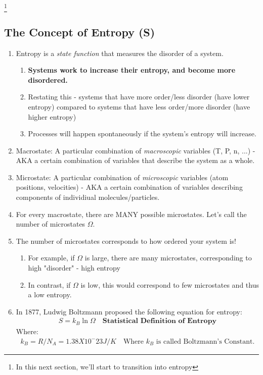 \documentclass{article}  %
\begin{document}
\footnote{In this next section, we'll start to transition into entropy}
\subsection*{The Concept of Entropy (S)}
\begin{enumerate}
    \item Entropy is a \emph{state function} that measures the disorder of a system.
    \begin{enumerate}
        \item \textbf{Systems work to increase their entropy, and become more disordered.}
        \item Restating this - systems that have more order/less disorder (have lower entropy) compared to systems that have less order/more disorder (have higher entropy)
        \item Processes will happen spontaneously if the system's entropy will increase.
    \end{enumerate}
    \item Macrostate: A particular combination of \emph{macroscopic} variables (T, P, n, ...) - AKA a certain combination of variables that describe the system as a whole.
    \item Microstate: A particular combination of \emph{microscopic} variables (atom positions, velocities) - AKA a certain combination of variables describing components of individiual molecules/particles.
    \item For every macrostate, there are MANY possible microstates. Let's call the number of microstates $\Omega$.
    \item The number of microstates corresponds to how ordered your system is!
        \begin{enumerate}
            \item For example, if $\Omega$ is large, there are many microstates, corresponding to high "disorder" - high entropy
            \item In contrast, if $\Omega$ is low, this would correspond to few microstates and thus a low entropy.
        \end{enumerate}
    \item In 1877, Ludwig Boltzmann proposed the following equation for entropy:
        \begin{equation*}
            \begin{aligned}
                S = k_B \ln \Omega \quad \textbf{Statistical Definition of Entropy}
            \end{aligned}
        \end{equation*}
        Where:
        \begin{equation*}
            \begin{aligned}
                k_B = R/N_A = 1.38X10^-23 J/K \quad \text{Where $k_B$ is called Boltzmann's Constant.}
            \end{aligned}
        \end{equation*}
\end{enumerate}
\end{document}
